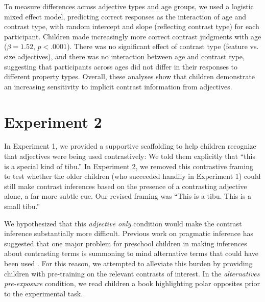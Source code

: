 \documentclass[man]{apa2}
\begin{document}
To measure differences across adjective types and age groups, we used a logistic mixed effect model, predicting correct responses as the interaction of age and contrast type, with random intercept and slope (reflecting contrast type) for each participant.  Children made increasingly more correct contrast judgments with age ($\beta = 1.52$, $p < .0001$). There was no significant effect of contrast type (feature vs. size adjectives), and there was no interaction between age and contrast type, suggesting that participants across ages did not differ in their responses to different property types.  Overall, these analyses show that children demonstrate an increasing sensitivity to implicit contrast information from adjectives.  





\section{Experiment 2}


In Experiment 1, we provided a supportive scaffolding to help children recognize that adjectives were being used contrastively: We told them explicitly that ``this is a special kind of tibu.''  In Experiment 2, we removed this contrastive framing to test whether the older children (who succeeded handily in Experiment 1) could still make contrast inferences based on the presence of a contrasting adjective alone, a far more subtle cue. Our revised framing was ``This is a tibu. This is a small tibu.'' 

We hypothesized that this \emph{adjective only} condition would make the contrast inference substantially more difficult. Previous work on pragmatic inference has suggested that one major problem for preschool children in making inferences about contrasting terms is summoning to mind alternative terms that could have been used \cite{barner2011}. For this reason, we attempted to alleviate this burden by providing children with pre-training on the relevant contrasts of interest. In the \emph{alternatives pre-exposure} condition, we read children a book highlighting polar opposites prior to the experimental task.
\end{document}
